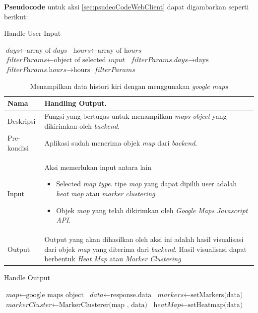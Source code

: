 \textbf{Pseudocode} untuk aksi \ref{sec:psudeoCodeWebClient} dapat digambarkan seperti berikut:
\begin{algorithm}
\caption{Handle User Input}\label{euclid}
\begin{algorithmic}[1]
\State $\textit{days} \gets \text{array of }\textit{days}$
\State $\textit{hours} \gets \text{array of }\textit{hours}$
\State $\textit{filterParams} \gets \text{object of selected }\textit{input}$
\State $\textit{filterParams.days} \rightarrow \text{days}$
\State $\textit{filterParams.hours} \rightarrow \text{hours}$
\State \Return $\textit{filterParams} $
\end{algorithmic}
\end{algorithm}


\begin{table}[H]
    \centering
       \caption{Menampilkan data histori kiri dengan menggunakan \textit{google maps}}
    \begin{tabular}{|p{3cm}|p{10cm}|}
    \hline
        Nama & Handling Output.\\
    \hline
    \hline
        Deskripsi & Fungsi yang bertugas untuk menampilkan \textit{maps object} yang dikirimkan oleh \textit{backend}.
        \\
    \hline
        Pre-kondisi & Aplikasi sudah menerima objek \textit{map} dari \textit{backend}.\\
    \hline
        Input & 
        Aksi memerlukan input antara lain 
        \begin{itemize}
            \item Selected \textit{map type}. tipe \textit{map} yang dapat dipilih user adalah \textit{heat map} atau \textit{marker clustering}.
            \item Objek \textit{map} yang telah dikirimkan oleh \textit{Google Maps Javascript API}.
        \end{itemize}
       \\
       \hline
        Output & 
        Output yang akan dihasilkan oleh aksi ini adalah hasil visualisasi dari objek \textit{map} yang diterima dari \textit{backend}. Hasil visualisasi dapat berbentuk \textit{Heat Map} atau \textit{Marker Clustering}
       \\
    \hline
    \end{tabular}
\end{table}

\begin{algorithm}[htbp]
\caption{Handle Output}
\begin{algorithmic}[1]
\State $\textit{map} \gets \text{google maps object}$
\State $\textit{data} \gets \text{response.data}$
    \State $\textit{markers} \gets \text{setMarkers(data)}$
    \State $\textit{markerCluster} \gets \text{MarkerClusterer(map , data)}$
\Else
    \State $\textit{heatMap} \gets \text{setHeatmap(data)}$
\EndIf
\EndProcedure
\end{algorithmic}
\end{algorithm}


